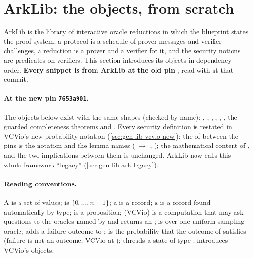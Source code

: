 \begingroup\sloppy
\section{ArkLib: the objects, from scratch}\label{sec:gen-lib-ark-objects}

ArkLib is the library of interactive oracle reductions in which the blueprint states the proof
system: a protocol is a schedule of prover messages and verifier challenges, a reduction is a
prover and a verifier for it, and the security notions are predicates on verifiers. This section
introduces its objects in dependency order. \textbf{Every snippet is from ArkLib at the old pin
}, read with  at that commit.

\paragraph{At the new pin \texorpdfstring{\texttt{7653a901}}{7653a901}.} The objects below exist with
the same shapes (checked by name): , ,
, , ,
, the guarded completeness theorems and
\allowbreak{}\allowbreak{}. Every security definition is restated in VCVio's new
probability notation (\cref{sec:gen-lib-vcvio-new}): the  of
\allowbreak{} between the pins is the notation and the lemma names
( $\to$ , ); the mathematical content
of ,  and the two
implications between them is unchanged. ArkLib now calls this whole framework \enquote{legacy}
(\cref{sec:gen-lib-ark-legacy}).

\paragraph{Reading conventions.} A  is a set of values;  is
$\{0, \dots, n-1\}$; a  is a record; a  is a record found
automatically by type;  is a proposition;  (VCVio) is a
computation that may ask questions to the oracles named by  and returns an ;
 is  over one uniform-sampling oracle;  adds a
failure outcome to ;  is the probability that the outcome of 
satisfies  (failure is not an outcome; VCVio at ); 
threads a state of type .  introduces VCVio's objects.

